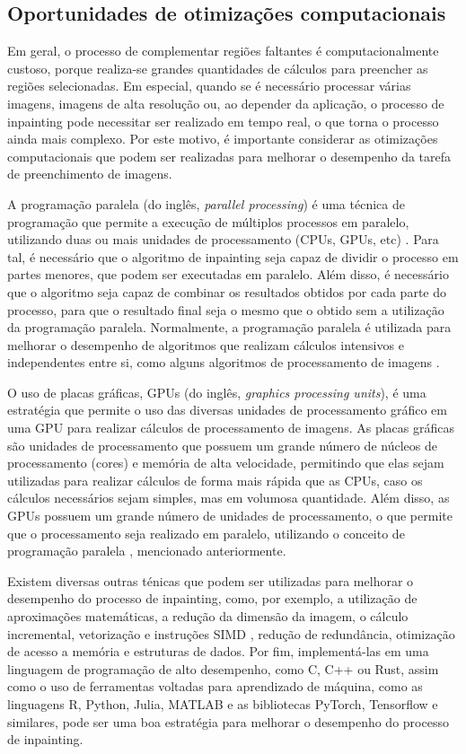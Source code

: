 \subsection{Oportunidades de otimizações computacionais}

Em geral, o processo de complementar regiões faltantes é computacionalmente custoso, porque realiza-se grandes quantidades de cálculos para preencher as regiões selecionadas. Em especial, quando se é necessário processar várias imagens, imagens de alta resolução ou, ao depender da aplicação, o processo de inpainting pode necessitar ser realizado em tempo real, o que torna o processo ainda mais complexo. Por este motivo, é importante considerar as otimizações computacionais que podem ser realizadas para melhorar o desempenho da tarefa de preenchimento de imagens.

A programação paralela (do inglês, \emph{parallel processing}) é uma técnica de programação que permite a execução de múltiplos processos em paralelo, utilizando duas ou mais unidades de processamento (CPUs, GPUs, etc) \cite{tanenbaum2014os}. Para tal, é necessário que o algoritmo de inpainting seja capaz de dividir o processo em partes menores, que podem ser executadas em paralelo. Além disso, é necessário que o algoritmo seja capaz de combinar os resultados obtidos por cada parte do processo, para que o resultado final seja o mesmo que o obtido sem a utilização da programação paralela.
Normalmente, a programação paralela é utilizada para melhorar o desempenho de algoritmos que realizam cálculos intensivos e independentes entre si, como alguns algoritmos de processamento de imagens \cite{gonzalez2006image}.

O uso de placas gráficas, GPUs (do inglês, \emph{graphics processing units}), é uma estratégia que permite o uso das diversas unidades de processamento gráfico em uma GPU para realizar cálculos de processamento de imagens. As placas gráficas são unidades de processamento que possuem um grande número de núcleos de processamento (cores) e memória de alta velocidade, permitindo que elas sejam utilizadas para realizar cálculos de forma mais rápida que as CPUs, caso os cálculos necessários sejam simples, mas em volumosa quantidade. Além disso, as GPUs possuem um grande número de unidades de processamento, o que permite que o processamento seja realizado em paralelo, utilizando o conceito de programação paralela \cite{tanenbaum2014os}, mencionado anteriormente.

Existem diversas outras ténicas que podem ser utilizadas para melhorar o desempenho do processo de inpainting, como, por exemplo, a utilização de aproximações matemáticas, a redução da dimensão da imagem, o cálculo incremental, vetorização e instruções SIMD \cite{intel2022manual}, redução de redundância, otimização de acesso a memória e estruturas de dados. Por fim, implementá-las em uma linguagem de programação de alto desempenho, como C, C++ ou Rust, assim como o uso de ferramentas voltadas para aprendizado de máquina, como as linguagens R, Python, Julia, MATLAB e as bibliotecas PyTorch, Tensorflow \cite{tensorflow2015-whitepaper} e similares, pode ser uma boa estratégia para melhorar o desempenho do processo de inpainting.

